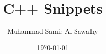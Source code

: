 \documentclass[10pt]{article}
\title{\vspace{-4ex}\Large{C++ Snippets}}
\author{Muhammad Samir Al-Sawalhy}
\date{\today}
\begin{document}
\begin{landscape}

  \begin{multicols}{2}

    \maketitle
    \vspace{-13ex}

    \tableofcontents

    \pagestyle{fancy}

    

  \end{multicols}

\end{landscape}
\end{document}
